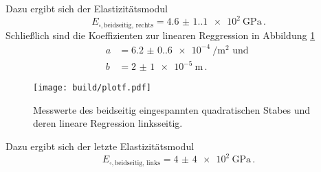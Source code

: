 Dazu ergibt sich der Elastizitätsmodul 
\begin{equation*}
    E_{\square,\text{beidseitig, rechts}}=\qty{4.6(1.1)e2}{\giga\pascal}\,.
\end{equation*}
Schließlich sind die Koeffizienten zur linearen Reggression in Abbildung \ref{fig:plotf} 
\begin{align*}
    a&=\qty{6.2(0.6)e-4}{\per\meter\squared} \text{ und }\\
    b&=\qty{2(1)e-5}{\meter}\,.
\end{align*}
\begin{figure}[H]
    \centering
    \label{fig:plotf}
    \caption{Messwerte des beidseitig eingespannten quadratischen Stabes und deren lineare Regression linksseitig.}
    \texttt{[image: build/plotf.pdf]}
\end{figure}
Dazu ergibt sich der letzte Elastizitätsmodul 
\begin{equation*}
    E_{\square,\text{beidseitig, links}}=\qty{4(4)e2}{\giga\pascal}\,.
\end{equation*}